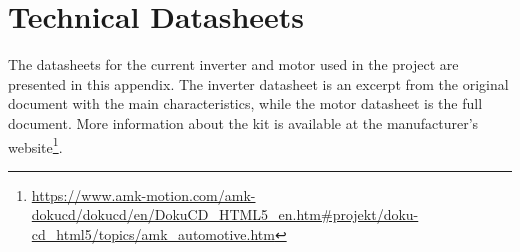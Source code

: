 
\chapter{Technical Datasheets}
\label{chapter:appendixDatasheets} %

The datasheets for the current inverter and motor used in the project are presented in this appendix. The inverter datasheet is an excerpt from the original document with the main characteristics, while the motor datasheet is the full document. More information about the kit is available at the manufacturer's website\footnote{\url{https://www.amk-motion.com/amk-dokucd/dokucd/en/DokuCD_HTML5_en.htm\#projekt/doku-cd_html5/topics/amk_automotive.htm}}.


% 
\def\excerpt{\section{AMK Motor Datasheet}\label{section:AMK_Motor_datasheet}}




% 
